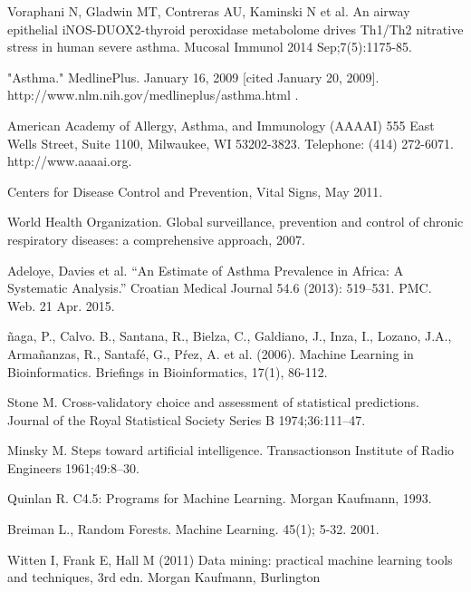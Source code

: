 \documentclass[conference,a4paper]{IEEEtran}
\begin{document}
\begin{thebibliography}{1}
	
	 Voraphani N, Gladwin MT, Contreras AU, Kaminski N et al. An airway epithelial iNOS-DUOX2-thyroid peroxidase metabolome drives Th1/Th2 nitrative stress in human severe asthma. Mucosal Immunol 2014 Sep;7(5):1175-85.
	
	 "Asthma." MedlinePlus. January 16, 2009 [cited January 20, 2009]. http://www.nlm.nih.gov/medlineplus/asthma.html .
	
	 American Academy of Allergy, Asthma, and Immunology (AAAAI) 555 East Wells Street, Suite 1100, Milwaukee, WI 53202-3823. Telephone: (414) 272-6071. http://www.aaaai.org.
	
	 Centers for Disease Control and Prevention, Vital Signs, May 2011.
	
	 World Health Organization. Global surveillance, prevention and control of chronic respiratory diseases: a comprehensive approach, 2007.
	
	 Adeloye, Davies et al. “An Estimate of Asthma Prevalence in Africa: A Systematic Analysis.” Croatian Medical Journal 54.6 (2013): 519–531. PMC. Web. 21 Apr. 2015.
	
	\~naga, P., Calvo. B., Santana, R., Bielza, C., Galdiano, J., Inza, I., Lozano, J.A., Arma\~nanzas, R., Santaf\'e, G., P\'rez, A. et al. (2006). Machine Learning in Bioinformatics. Briefings in Bioinformatics, 17(1), 86-112.
	
	 Stone M. Cross-validatory choice and assessment of statistical predictions. Journal of the Royal Statistical Society Series B 1974;36:111–47.
	
	 Minsky M. Steps toward artificial intelligence. Transactionson Institute of Radio Engineers 1961;49:8–30.
	
	Quinlan R. C4.5: Programs for Machine Learning. Morgan Kaufmann, 1993.
	
	 Breiman L., Random Forests. Machine Learning. 45(1); 5-32. 2001.
	
	 Witten I, Frank E, Hall M (2011) Data mining: practical machine learning tools and techniques, 3rd edn. Morgan Kaufmann, Burlington
	

\end{thebibliography}
\end{document}
